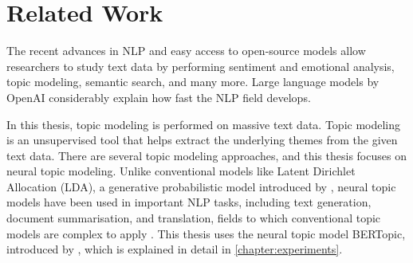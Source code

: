 
\chapter{Related Work}\label{chapter:related_work}

The recent advances in \ac{NLP} and easy access to open-source models allow researchers to 
study text data by performing sentiment and emotional analysis, topic modeling, 
semantic search, and many more. Large language models by OpenAI considerably 
explain how fast the NLP field develops.

In this thesis, topic modeling is performed on massive text data. Topic modeling is an 
unsupervised tool that helps extract the underlying themes from the given text data. 
There are several topic modeling approaches, and this thesis focuses on neural topic modeling. 
Unlike conventional models like Latent Dirichlet Allocation (LDA), a generative probabilistic 
model introduced by \textcite{blei_lda_2003}, neural topic models have been used in important NLP 
tasks, including text generation, document summarisation, and translation, fields to 
which conventional topic models are complex to apply \parencite{zhao_neural_topic_models_2021}.
This thesis uses the neural topic model BERTopic, introduced by \textcite{bertopic}, 
which is explained in detail in \autoref{chapter:experiments}.

